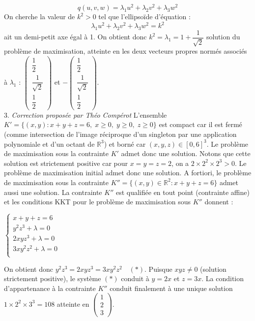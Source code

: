 \documentclass{fancybook}
\begin{document}
$$ q(u,v,w) = \lambda_1 u^2 + \lambda_2 v^2 + \lambda_3 w ^2 $$
On cherche la valeur de $k^2>0$ tel que l'ellipsoïde d'équation :
$$\lambda_1 u^2 + \lambda_2 v^2 + \lambda_3 w ^2 = k^2 $$
ait un demi-petit axe égal à 1. On obtient donc $k^2= \lambda_1 = 1 + \dfrac{1}{\sqrt{2}}$ solution du problème de maximisation, atteinte en les deux vecteurs propres normés associés à $\lambda_1$ : $\begin{pmatrix} \dfrac{1}{2} \\ \dfrac{1}{\sqrt{2}} \\ \dfrac{1}{2} \end{pmatrix}$ et $-\begin{pmatrix} \dfrac{1}{2} \\ \dfrac{1}{\sqrt{2}} \\ \dfrac{1}{2} \end{pmatrix}$. \\

3. \hfill \textit{Correction proposée par Théo Compérot}\newline
L'ensemble $K' = \{(x,y) : x+y+z = 6,\; x\geqslant 0,\; y\geqslant 0,\; z\geqslant 0\}$ est compact car il est fermé (comme intersection de l'image réciproque d'un singleton par une application polynomiale et d'un octant de $\mathbb R^3$) et borné car $(x,y,z) \in [0,6]^3$. Le problème de maximisation sous la contrainte $K'$ admet donc une solution. Notons que cette solution est strictement positive car pour $x=y=z=2$, on a $2\times 2^2 \times 2^3 >0$. Le problème de maximisation initial admet donc une solution. A fortiori, le problème de maximisation sous la contrainte $K'' = \{(x,y) \in \mathbb{R}^2 : x+y+z = 6 \}$ admet aussi une solution. La contrainte $K''$ est qualifiée en tout point (contrainte affine) et les conditions KKT pour le problème de maximisation sous $K''$ donnent :

$\begin{cases}
x+y+z = 6 \\
y^2z^3 + \lambda = 0 \\
2xyz^3 + \lambda = 0 \\
3xy^2z^2 + \lambda = 0 \\
\end{cases}$

On obtient donc $y^2z^3 = 2xyz^3 = 3xy^2z^2 \quad (\ast)$. Puisque $xyz \neq 0$ (solution strictement positive), le système $(\ast)$ conduit à $y=2x$ et $z = 3x$. La condition d'appartenance à la contrainte $K''$ conduit finalement à une unique solution $1\times 2^2 \times 3^3 = 108$ atteinte en $\begin{pmatrix} 1 \\ 2\\ 3 \end{pmatrix}$.
\end{document}
